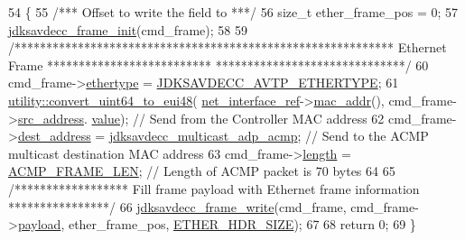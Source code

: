 \begin{DoxyCode}
54 \{
55     \textcolor{comment}{/*** Offset to write the field to ***/}
56     \textcolor{keywordtype}{size\_t} ether\_frame\_pos = 0;
57     \hyperlink{group__frame_ga14d8effbd6816c69743c5be3e98fea27}{jdksavdecc\_frame\_init}(cmd\_frame);
58 
59     \textcolor{comment}{/************************************************************ Ethernet Frame **************************
      ******************************/}
60     cmd\_frame->\hyperlink{structjdksavdecc__frame_aa9296c58dc24c63c4ee927db394a97d7}{ethertype} = \hyperlink{group__pdu_ga9fe7bd6b7d7b0f92f5fdbb910068197f}{JDKSAVDECC\_AVTP\_ETHERTYPE};
61     \hyperlink{namespaceavdecc__lib_1_1utility_a723fa51b0a25cbec764d4e7fa1f5daac}{utility::convert\_uint64\_to\_eui48}(
      \hyperlink{namespaceavdecc__lib_adb4da03bc65b7846cc240ee919bbde19}{net\_interface\_ref}->\hyperlink{classavdecc__lib_1_1net__interface__imp_a742e975c065f9067f42182847df080da}{mac\_addr}(), cmd\_frame->\hyperlink{structjdksavdecc__frame_a74855d22d112da72f29ba4959ebc639b}{src\_address}.
      \hyperlink{structjdksavdecc__eui48_a18b93f04637cf37688ec10a33a0cbc26}{value}); \textcolor{comment}{// Send from the Controller MAC address}
62     cmd\_frame->\hyperlink{structjdksavdecc__frame_a104d37031c593f66765dc66d8ac8962b}{dest\_address} = \hyperlink{group__pdu_ga151652dc8a9ab46279afe5930fe815d5}{jdksavdecc\_multicast\_adp\_acmp};      
                                       \textcolor{comment}{// Send to the ACMP multicast destination MAC address}
63     cmd\_frame->\hyperlink{structjdksavdecc__frame_a1892eba2086d12ac2b09005aeb09ea3b}{length} = \hyperlink{namespaceavdecc__lib_a2b5e266e2064669372f6c59e977c6c88a72da19de32961d6bc4541a6d7408b6e2}{ACMP\_FRAME\_LEN};                                                
                  \textcolor{comment}{// Length of ACMP packet is 70 bytes}
64 
65     \textcolor{comment}{/****************** Fill frame payload with Ethernet frame information ****************/}
66     \hyperlink{group__frame_gaba1e860c060886e82198907b17214aee}{jdksavdecc\_frame\_write}(cmd\_frame, cmd\_frame->\hyperlink{structjdksavdecc__frame_a220ad076814a31ae0163e722e523de46}{payload}, ether\_frame\_pos, 
      \hyperlink{namespaceavdecc__lib_a6c827b1a0d973e18119c5e3da518e65ca9512ad9b34302ba7048d88197e0a2dc0}{ETHER\_HDR\_SIZE});
67 
68     \textcolor{keywordflow}{return} 0;
69 \}
\end{DoxyCode}


